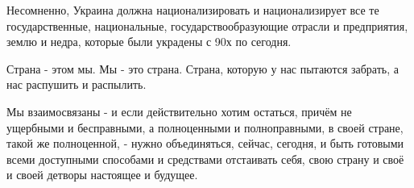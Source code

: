 Несомненно, Украина должна национализировать и национализирует все те
государственные, национальные, государствообразующие отрасли и предприятия,
землю и недра, которые были украдены с 90х по сегодня.

Страна - этом мы. Мы - это страна. Страна, которую у нас пытаются забрать, а
нас распушить и распылить. 

Мы взаимосвязаны - и если действительно хотим остаться, причём не ущербными и
бесправными, а полноценными и полноправными, в своей стране, такой же
полноценной, - нужно объединяться, сейчас, сегодня, и быть готовыми всеми
доступными способами и средствами отстаивать себя, свою страну и своё и своей
детворы настоящее и будущее.

